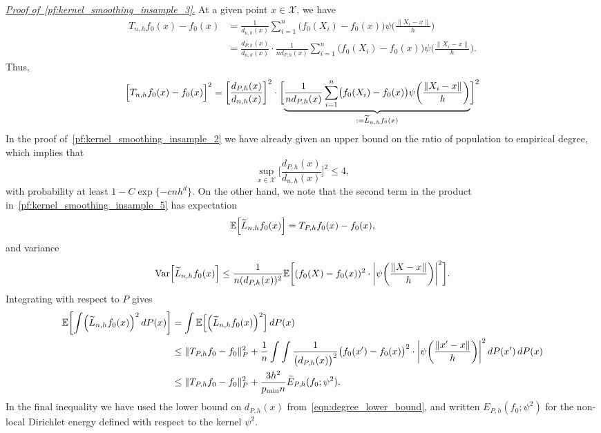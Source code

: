 \documentclass[aos]{imsart}
\theoremstyle{plain}
\theoremstyle{definition}
\theoremstyle{remark}
\newcommand{\Ebb}{\mathbb{E}}
\newcommand{\wt}[1]{\widetilde{#1}}
\newcommand{\mc}[1]{\mathcal{#1}}
\newcommand{\Var}{\mathrm{Var}}
\newcommand{\1}{\mathbf{1}}
\begin{document}
\underline{\emph{Proof of~\eqref{pf:kernel_smoothing_insample_3}}.}
At a given point $x \in \mc{X}$, we have
\begin{align*}
T_{n,h}f_0(x) - f_0(x) & = \frac{1}{d_{n,h}(x)} \sum_{i = 1}^{n} \bigl(f_0(X_i) - f_0(x)\bigr) \psi\biggl(\frac{\|X_i - x\|}{h}\biggr) \\
& = \frac{d_{P,h}(x)}{d_{n,h}(x)} \cdot \frac{1}{nd_{P,h}(x)} \sum_{i = 1}^{n} \bigl(f_0(X_i) - f_0(x)\bigr) \psi\biggl(\frac{\|X_i - x\|}{h}\biggr).
\end{align*}
Thus,
\begin{equation}
\label{pf:kernel_smoothing_insample_5}
\Bigl[T_{n,h}f_0(x) - f_0(x)\Bigr]^2 = \biggl[\frac{d_{P,h}(x)}{d_{n,h}(x)}\biggr]^2 \cdot \biggl[\underbrace{\frac{1}{nd_{P,h}(x)}\sum_{i = 1}^{n} \bigl(f_0(X_i) - f_0(x)\bigr) \psi\biggl(\frac{\|X_i - x\|}{h}\biggr)}_{:= \wt{L}_{n,h}f_0(x)}\biggr]^2
\end{equation}
In the proof of~\eqref{pf:kernel_smoothing_insample_2} we have already given an upper bound on the ratio of population to empirical degree, which implies that
\begin{equation*}
\sup_{x \in \mc{X}} \biggl[\frac{d_{P,h}(x)}{d_{n,h}(x)}\biggr]^2 \leq 4,
\end{equation*}
with probability at least $1 - C\exp\{-cnh^d\}$. On the other hand, we note that the second term in the product in~\eqref{pf:kernel_smoothing_insample_5} has expectation
\begin{equation*}
\Ebb\Bigl[\wt{L}_{n,h}f_0(x)\Bigr] = T_{P,h}f_0(x) - f_0(x),
\end{equation*} 
and variance 
\begin{equation*}
\Var\Bigl[\wt{L}_{n,h}f_0(x)\Bigr] \leq \frac{1}{n(d_{P,h}(x))^2} \Ebb\biggl[(f_0(X) - f_0(x))^2 \cdot \biggl|\psi\biggl(\frac{\|X - x\|}{h}\biggr)\biggr|^2\biggr].
\end{equation*}
Integrating with respect to $P$ gives
\begin{align*}
\Ebb\biggl[\int \Bigl(\wt{L}_{n,h}f_0(x)\Bigr)^2 \,dP(x)\biggr] & = \int \Ebb\Bigl[\Bigl(\wt{L}_{n,h}f_0(x)\Bigr)^2\Bigr] \,dP(x) \\
& \leq \| T_{P,h}f_0 - f_0\|_P^2 + \frac{1}{n}\int \int \frac{1}{\bigl(d_{P,h}(x)\bigr)^2} \bigl(f_0(x') - f_0(x)\bigr)^2 \cdot \biggl|\psi\biggl(\frac{\|x' - x\|}{h}\biggr)\biggr|^2 \,dP(x') \,dP(x) \\
& \leq \| T_{P,h}f_0 - f_0\|_P^2 + \frac{3h^2}{p_{\min}n} \wt{E}_{P,h}(f_0;\psi^2).
\end{align*}
In the final inequality we have used the lower bound on $d_{P,h}(x)$ from~\eqref{eqn:degree_lower_bound}, and written $E_{P,h}(f_0;\psi^2)$ for the non-local Dirichlet energy defined with respect to the kernel $\psi^2$. 
\end{document}
